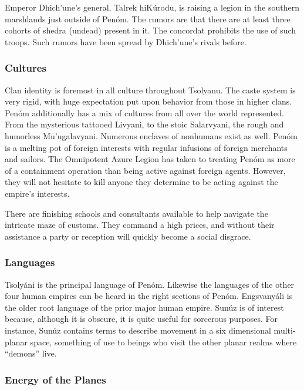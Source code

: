 Emperor Dhich'une's general, Talrek hiKúrodu, is raising a legion in the southern marshlands just outside of Penóm. The rumors are that there are at least three cohorts of shedra (undead) present in it. The concordat prohibits the use of such troops. Such rumors have been spread by Dhich'une's rivals before.

\subsubsection{Cultures}

Clan identity is foremost in all culture throughout Tsolyanu. The caste system is very rigid, with huge expectation put upon behavior from those in higher clans. Penóm additionally has a mix of cultures from all over the world represented. From the mysterious tattooed Livyani, to the stoic Salarvyani, the rough and humorless Mu'ugalavyani. Numerous enclaves of nonhumans exist as well. Penóm is a melting pot of foreign interests with regular infusions of foreign merchants and sailors. The Omnipotent Azure Legion has taken to treating Penóm as more of a containment operation than being active against foreign agents.  However, they will not hesitate to kill anyone they determine to be acting against the empire's interests.

There are finishing schools and consultants available to help navigate the intricate maze of customs. They command a high prices, and without their assistance a party or reception will quickly become a social disgrace.

\subsubsection{Languages}

Tsolyáni is the principal language of Penóm. Likewise the languages of the other four human empires can be heard in the right sections of Penóm. Engsvanyáli is the older root language of the prior major human empire. Sunúz is of interest because, although it is obscure, it is quite useful for sorcerous purposes. For instance, Sunúz contains terms to describe movement in a six dimensional multi-planar space, something of use to beings who visit the other planar realms where ``demons'' live.

\subsubsection{Energy of the Planes}

